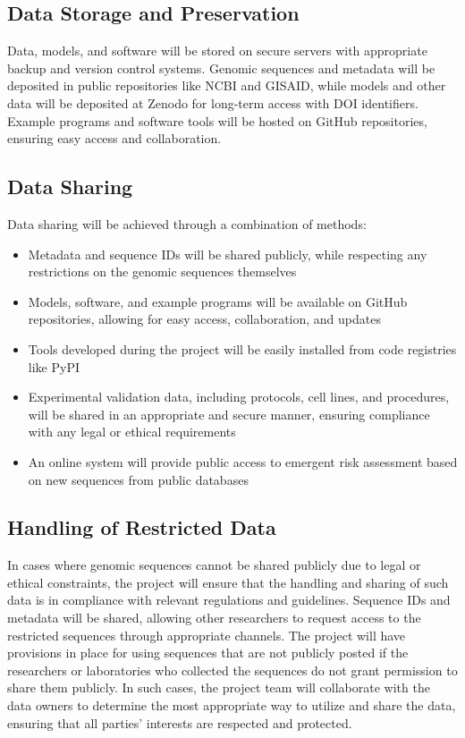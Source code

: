 \documentclass[onecolumn, compsoc,12pt]{IEEEtran}
\begin{document}
\subsection{Data Storage and Preservation}

Data, models, and software will be stored on secure servers with appropriate backup and version control systems. Genomic sequences and metadata will be deposited in public repositories like NCBI and GISAID, while models and other data will be deposited at Zenodo for long-term access with DOI identifiers. Example programs and software tools will be hosted on GitHub repositories, ensuring easy access and collaboration.

\subsection{Data Sharing}

Data sharing will be achieved through a combination of methods:

\begin{itemize}
  \item Metadata and sequence IDs will be shared publicly, while respecting any restrictions on the genomic sequences themselves
  \item Models, software, and example programs will be available on GitHub repositories, allowing for easy access, collaboration, and updates
  \item Tools developed during the project will be easily installed from code registries like PyPI
  \item Experimental validation data, including protocols, cell lines, and procedures, will be shared in an appropriate and secure manner, ensuring compliance with any legal or ethical requirements
  \item An online system will provide public access to emergent risk assessment based on new sequences from public databases
\end{itemize}

\subsection{Handling of Restricted Data}

In cases where genomic sequences cannot be shared publicly due to legal or ethical constraints, the project will ensure that the handling and sharing of such data is in compliance with relevant regulations and guidelines. Sequence IDs and metadata will be shared, allowing other researchers to request access to the restricted sequences through appropriate channels. The project will have provisions in place for using sequences that are not publicly posted if the researchers or laboratories who collected the sequences do not grant permission to share them publicly. In such cases, the project team will collaborate with the data owners to determine the most appropriate way to utilize and share the data, ensuring that all parties' interests are respected and protected.
\end{document}
